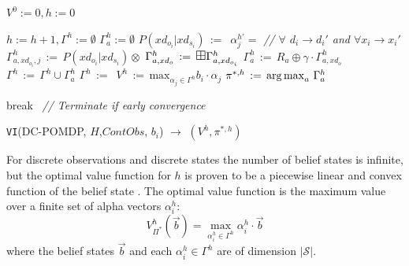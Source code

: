 \documentclass{article} %
\def\argmax{\operatornamewithlimits{arg\max}}
\begin{document}
\begin{algorithm}[t!]
\vspace{-.5mm}
\dontprintsemicolon
{}
\Begin
{
   $V^0:=0, h:=0$\;
   {
       $h:=h+1, \Gamma^h :=\emptyset$\;
       {
			$\Gamma_{a}^h :=\emptyset$ \;       		
       			{$P(xd_{o_i}|xd_{s_i}) \,:=\,$ \;}
       		 {
       			{
   	 		  		$\alpha_j^{h'}=$  \;
   	 		  		\emph{// $\forall$ $d_i \to d_i'$ and $\forall x_i \to x_i'$} \; 
   	 		    	$\Gamma_{a,xd_{o_i},j}^h \,:=\, P(xd_{o_i}|xd_{s_i}) \otimes$ \;
       	      	}
       	      	$\Gamma_{a,xd_o}^h\,:=\,\textrm{\large $\boxplus$} \Gamma_{a,xd_{o_i}}^h$\;
       	     }
           $\Gamma_a^{h} \,:=\,R_a \oplus \gamma \cdot \Gamma_{a,xd_o}^h$\;
            $\Gamma^{h} \,:=\, \Gamma^{h} \cup \Gamma_a^{h}$\;
        }  
              $\Gamma^h \,:=\, $ \;
              $V^h \,:=\, \mathrm{max}_{\alpha_j \in \Gamma^h} b_i \cdot \alpha_j$\;
              $\pi^{*,h} \,:=\, \argmax_{a} \, \Gamma_a^{h}$\;

           {break $\,$ \emph{// Terminate if early convergence}\;}
   }
      \;
}
\caption{\footnotesize \texttt{VI}(DC-POMDP, $H$,$ContObs$, $b_i$) $\longrightarrow$ $(V^h,\pi^{*,h})$ \label{alg:vi}}
\vspace{-1mm}
\end{algorithm}
\decmargin{.5em}
For discrete observations and discrete states the number of belief states is infinite, but the optimal value function for $h$ is proven to be a piecewise linear and convex function of the belief state \cite{smallwoodSondik}. The optimal value function is the maximum value over a finite set of alpha vectors  $\alpha^h_i$:%
{\footnotesize
\begin{equation}
V^h_{\Pi^*}(\vec{b}) = \max_{\alpha^h_i \in \Gamma^h} \alpha^h_i \cdot \vec{b}
\end{equation}
}
where the belief states $\vec{b}$ and each $\alpha^h_i \in \Gamma^h$ are of dimension $|\mathcal{S}|$. 
\end{document}
